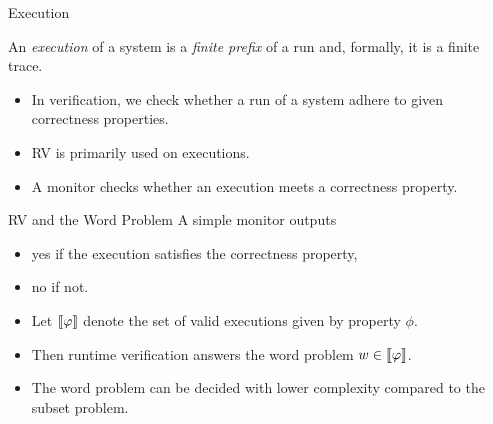 \begin{frame}[t]{Execution}
  \begin{center}
  \end{center}

  \begin{definition}[Execution]
    An \emph{execution} of a system is a
    \emph{finite prefix} of a run and, formally, it is a finite
    trace.
  \end{definition}
  
  \begin{itemize}
    \item In verification, we check whether a
      run of a system adhere to given
      correctness properties.
    \item RV is primarily used on executions.
    \item A monitor checks whether an execution meets a correctness property. 
  \end{itemize}
\end{frame}

\begin{Frame}{RV and the Word Problem}
  A simple monitor outputs
  \begin{itemize}
    \item \alert{yes} if the execution satisfies the correctness property,
    \item \alert{no} if not.
  \end{itemize}
  
  \xxx
  
  \begin{itemize}
    \item Let $\llbracket \varphi \rrbracket$ denote the set of valid executions given
      by property $\phi$.
    \item Then runtime verification answers the \alert{word problem}
      $w \in \llbracket \varphi \rrbracket$.
    \item The word problem can be decided with lower
      complexity compared to the subset problem.
  \end{itemize}
\end{Frame}

